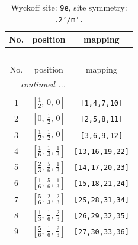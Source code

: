 \documentclass[fleqn,8pt]{jsarticle}
\begin{document}
\begin{longtable}{ccc}
\caption{Wyckoff site: {\tt 9e}, site symmetry: {\tt .2'/m'.}}
 \\
 \hline \hline
No. & position & mapping \\ \hline \endfirsthead

\multicolumn{2}{l}{\tablename\ \thetable{}} \\
 \hline \hline
No. & position & mapping \\ \hline \endhead

 \hline \hline
\multicolumn{2}{r}{\footnotesize\it continued ...} \\ \endfoot

 \hline \hline
\multicolumn{2}{r}{} \\ \endlastfoot

1 & $\left[ \frac{1}{2},\, 0,\, 0 \right]$ & {\tt [1,4,7,10]} \\ \hline
2 & $\left[ 0,\, \frac{1}{2},\, 0 \right]$ & {\tt [2,5,8,11]} \\ \hline
3 & $\left[ \frac{1}{2},\, \frac{1}{2},\, 0 \right]$ & {\tt [3,6,9,12]} \\ \hline
4 & $\left[ \frac{1}{6},\, \frac{1}{3},\, \frac{1}{3} \right]$ & {\tt [13,16,19,22]} \\ \hline
5 & $\left[ \frac{2}{3},\, \frac{5}{6},\, \frac{1}{3} \right]$ & {\tt [14,17,20,23]} \\ \hline
6 & $\left[ \frac{1}{6},\, \frac{5}{6},\, \frac{1}{3} \right]$ & {\tt [15,18,21,24]} \\ \hline
7 & $\left[ \frac{5}{6},\, \frac{2}{3},\, \frac{2}{3} \right]$ & {\tt [25,28,31,34]} \\ \hline
8 & $\left[ \frac{1}{3},\, \frac{1}{6},\, \frac{2}{3} \right]$ & {\tt [26,29,32,35]} \\ \hline
9 & $\left[ \frac{5}{6},\, \frac{1}{6},\, \frac{2}{3} \right]$ & {\tt [27,30,33,36]} \\
\end{longtable}
\renewcommand{\arraystretch}{1.2}
\end{document}
